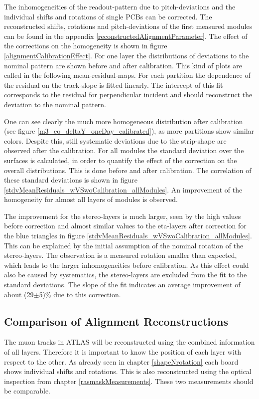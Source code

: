 \documentclass[
twoside,            %
BCOR1.4cm,          %
10pt,               %
headings=normal,    %
headsepline,        %
clearplainpage,		%
final,              %
div=14,
open=right,
bibliography=toc
]{scrreprt}
\begin{document}
The inhomogeneities of the readout-pattern due to pitch-deviations and the individual shifts and rotations of single PCBs can be corrected.
The reconstructed shifts, rotations and pitch-deviations of the first measured modules can be found in the appendix \ref{reconstructedAlignmentParameter}.
The effect of the corrections on the homogeneity is shown in figure \ref{alignmentCalibrationEffect}.
For one layer the distributions of deviations to the nominal pattern are shown before and after calibration.
This kind of plots are called in the following mean-residual-maps.
For each partition the dependence of the residual on the track-slope is fitted linearly.
The intercept of this fit corresponds to the residual for perpendicular incident and should reconstruct the deviation to the nominal pattern.

One can see clearly the much more homogeneous distribution after calibration (see figure \ref{m3_eo_deltaY_oneDay_calibrated}), as more partitions show similar colors.
Despite this, still systematic deviations due to the strip-shape are observed after the calibration.
For all modules the standard deviation over the surfaces is calculated, in order to quantify the effect of the correction on the overall distributions.
This is done before and after calibration.
The correlation of these standard deviations is shown in figure \ref{stdvMeanResiduals_wVSwoCalibration_allModules}.
An improvement of the homogeneity for almost all layers of modules is observed.

The improvement for the stereo-layers is much larger, seen by the high values before correction and almost similar values to the eta-layers after correction for the blue triangles in figure \ref{stdvMeanResiduals_wVSwoCalibration_allModules}.
This can be explained by the initial assumption of the nominal rotation of the stereo-layers.
The observation is a measured rotation smaller than expected, which leads to the larger inhomogeneities before calibration.
As this effect could also be caused by systematics, the stereo-layers are excluded from the fit to the standard deviations.
The slope of the fit indicates an average improvement of about (29$\pm$5)\% due to this correction.

\subsection{Comparison of Alignment Reconstructions}
\label{alignmentComparison}

The muon tracks in ATLAS will be reconstructed using the combined information of all layers.
Therefore it is important to know the position of each layer with respect to the other.
As already seen in chapter \ref{shapeNrotation} each board shows individual shifts and rotations.
This is also reconstructed using the optical inspection from chapter \ref{rasmaskMeasurements}.
These two measurements should be comparable.
\end{document}
